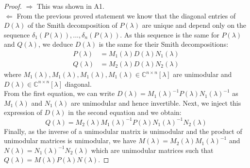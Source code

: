 \documentclass[11pt]{article}
\newcommand{\complex}{\mathbb{C}} %
\begin{document}
\begin{proof}
$\Rightarrow$ This was shown in A1.\\
$\Leftarrow$
From the previous proved statement we know that the diagonal entries of $D(\lambda)$ of the Smith decomposition of $P(\lambda)$ are unique and depend only on the sequence $\delta_1(P(\lambda)),...,\delta_n(P(\lambda))$. As this sequence is the same for $P(\lambda)$ and $Q(\lambda)$, we deduce $D(\lambda)$ is the same for their Smith decompositions:
\begin{align*}
    P(\lambda)&=M_1(\lambda) D(\lambda) N_1(\lambda)\\
    Q(\lambda)&=M_2(\lambda) D(\lambda) N_2(\lambda)
\end{align*}
where $M_1(\lambda),M_1(\lambda),M_1(\lambda),M_1(\lambda)\in\complex^{n\times n}[\lambda]$ are unimodular and $D(\lambda)\in\complex^{n\times n}[\lambda]$ diagonal.\\
From the first equation, we can write $D(\lambda)=M_1(\lambda)^{-1} P(\lambda) N_1(\lambda)^{-1}$ as $M_1(\lambda)$ and $N_1(\lambda)$ are unimodular and hence invertible. Next, we inject this expression of $D(\lambda)$ in the second equation and we obtain:
\begin{equation*}
    Q(\lambda)=M_2(\lambda) M_1(\lambda)^{-1} P(\lambda) N_1(\lambda)^{-1} N_2(\lambda)
\end{equation*}
Finally, as the inverse of a unimodular matrix is unimodular and the product of unimodular matrices is unimodular, we have $M(\lambda)=M_2(\lambda) M_1(\lambda)^{-1}$ and $N(\lambda)=N_1(\lambda)^{-1} N_2(\lambda)$ which are unimodular matrices such that $Q(\lambda)=M(\lambda)P(\lambda)N(\lambda)$.

\end{proof}
\end{document}

